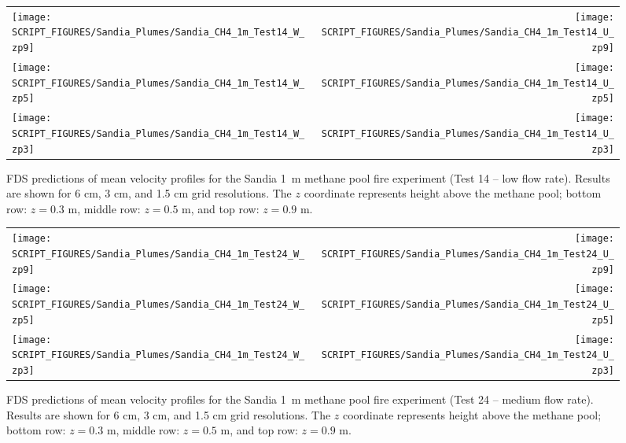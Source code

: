\newpage

\begin{figure}[p]
\begin{tabular*}{\textwidth}{l@{\extracolsep{\fill}}r}
\texttt{[image: SCRIPT\_FIGURES/Sandia\_Plumes/Sandia\_CH4\_1m\_Test14\_W\_zp9]} &
\texttt{[image: SCRIPT\_FIGURES/Sandia\_Plumes/Sandia\_CH4\_1m\_Test14\_U\_zp9]} \\
\texttt{[image: SCRIPT\_FIGURES/Sandia\_Plumes/Sandia\_CH4\_1m\_Test14\_W\_zp5]} &
\texttt{[image: SCRIPT\_FIGURES/Sandia\_Plumes/Sandia\_CH4\_1m\_Test14\_U\_zp5]} \\
\texttt{[image: SCRIPT\_FIGURES/Sandia\_Plumes/Sandia\_CH4\_1m\_Test14\_W\_zp3]} &
\texttt{[image: SCRIPT\_FIGURES/Sandia\_Plumes/Sandia\_CH4\_1m\_Test14\_U\_zp3]}
\end{tabular*}
\caption[Sandia 1~m methane pool fire (Test 14) mean velocity profiles]
{FDS predictions of mean velocity profiles for the Sandia 1~m methane pool fire experiment (Test 14 -- low flow rate). Results are shown for 6 cm, 3 cm, and 1.5 cm grid resolutions. The $z$ coordinate represents height above the methane pool; bottom row: $z=0.3$ m, middle row: $z=0.5$ m, and top row: $z=0.9$ m.}
\label{Sandia_CH4_1m_Test14_velocity}
\end{figure}

\begin{figure}[p]
\begin{tabular*}{\textwidth}{l@{\extracolsep{\fill}}r}
\texttt{[image: SCRIPT\_FIGURES/Sandia\_Plumes/Sandia\_CH4\_1m\_Test24\_W\_zp9]} &
\texttt{[image: SCRIPT\_FIGURES/Sandia\_Plumes/Sandia\_CH4\_1m\_Test24\_U\_zp9]} \\
\texttt{[image: SCRIPT\_FIGURES/Sandia\_Plumes/Sandia\_CH4\_1m\_Test24\_W\_zp5]} &
\texttt{[image: SCRIPT\_FIGURES/Sandia\_Plumes/Sandia\_CH4\_1m\_Test24\_U\_zp5]} \\
\texttt{[image: SCRIPT\_FIGURES/Sandia\_Plumes/Sandia\_CH4\_1m\_Test24\_W\_zp3]} &
\texttt{[image: SCRIPT\_FIGURES/Sandia\_Plumes/Sandia\_CH4\_1m\_Test24\_U\_zp3]}
\end{tabular*}
\caption[Sandia 1~m methane pool fire (Test 24) mean velocity profiles]
{FDS predictions of mean velocity profiles for the Sandia 1~m methane pool fire experiment (Test 24 -- medium flow rate). Results are shown for 6 cm, 3 cm, and 1.5 cm grid resolutions. The $z$ coordinate represents height above the methane pool; bottom row: $z=0.3$ m, middle row: $z=0.5$ m, and top row: $z=0.9$ m.}
\label{Sandia_CH4_1m_Test24_velocity}
\end{figure}

